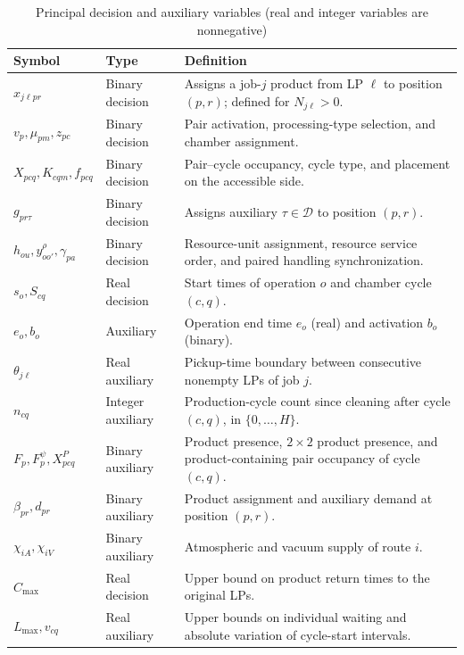 \documentclass[final,5p,times,twocolumn]{elsarticle}
\begin{document}
\begin{table}[t]
\centering\small
\caption{Principal decision and auxiliary variables (real and integer variables are nonnegative)}
\label{tab:symbol-cn-b}
\renewcommand{\arraystretch}{1.05}
\setlength{\tabcolsep}{4pt}
\begin{tabular}{@{}C{0.20\textwidth}C{0.16\textwidth}C{\textwidth-16pt\relax}@{}}
\toprule
Symbol & Type & Definition\\\midrule
$x_{j\ell pr}$ & Binary decision & Assigns a job-$j$ product from LP $\ell$ to position $(p,r)$; defined for $N_{j\ell}>0$.\\
$v_p,\mu_{pm},z_{pc}$ & Binary decision & Pair activation, processing-type selection, and chamber assignment.\\
$X_{pcq},K_{cqm},f_{pcq}$ & Binary decision & Pair--cycle occupancy, cycle type, and placement on the accessible side.\\
$g_{pr\tau}$ & Binary decision & Assigns auxiliary $\tau\in\mathcal D$ to position $(p,r)$.\\
$h_{ou},y^\rho_{oo'},\gamma_{pa}$ & Binary decision & Resource-unit assignment, resource service order, and paired handling synchronization.\\
$s_o,S_{cq}$ & Real decision & Start times of operation $o$ and chamber cycle $(c,q)$.\\
$e_o,b_o$ & Auxiliary & Operation end time $e_o$ (real) and activation $b_o$ (binary).\\
$\theta_{j\ell}$ & Real auxiliary & Pickup-time boundary between consecutive nonempty LPs of job $j$.\\
$n_{cq}$ & Integer auxiliary & Production-cycle count since cleaning after cycle $(c,q)$, in $\{0,\ldots,H\}$.\\
$F_p,F_p^\psi,X^P_{pcq}$ & Binary auxiliary & Product presence, $2\times2$ product presence, and product-containing pair occupancy of cycle $(c,q)$.\\
$\beta_{pr},d_{pr}$ & Binary auxiliary & Product assignment and auxiliary demand at position $(p,r)$.\\
$\chi_{iA},\chi_{iV}$ & Binary auxiliary & Atmospheric and vacuum supply of route $i$.\\
$C_{\max}$ & Real decision & Upper bound on product return times to the original LPs.\\
$L_{\max},v_{cq}$ & Real auxiliary & Upper bounds on individual waiting and absolute variation of cycle-start intervals.\\
\bottomrule
\end{tabular}
\end{table}
\end{document}
